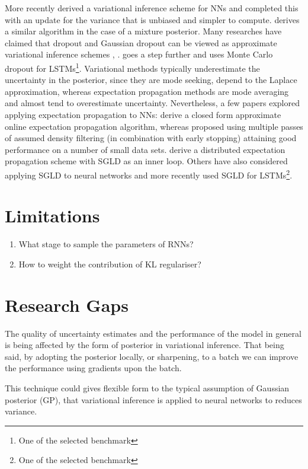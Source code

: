 More recently \cite{Graves2011} derived a variational inference scheme for NNs and
\cite{Blundell2015a} completed this with an update for the variance that is unbiased and simpler to compute.
\cite{Graves2016} derives a similar algorithm in the case of a mixture posterior.
Many researches have claimed that dropout \cite{Srivastava2014} and Gaussian dropout \cite{Wang2013} can be viewed as approximate variational inference schemes \cite{Gal2015}, \cite{Kingma2015}.
\cite{Gan2016} goes a step further and uses Monte Carlo dropout for LSTMs\footnote{One of the selected benchmark}.
Variational methods typically underestimate the uncertainty in the posterior, since they are mode seeking, depend to the Laplace approximation, whereas expectation propagation methods are mode averaging and almost tend to overestimate uncertainty.
Nevertheless, a few papers explored applying expectation propagation to NNs:
\cite{Soudry2014} derive a closed form approximate online expectation propagation algorithm, whereas \cite{Adams2015a} proposed using multiple passes of assumed density filtering (in combination with early stopping) attaining good performance on a number of small data sets.
\cite{Teh2015a} derive a distributed expectation propagation scheme with SGLD \cite{Welling2011} as an inner loop.
Others have also considered applying SGLD to neural networks \cite{Li2016a} and \cite{Gan2016} more recently used SGLD for LSTMs\footnote{One of the selected benchmark}.

\section{Limitations}
\begin{enumerate}
\item What stage to sample the parameters of RNNs?
\item How to weight the contribution of KL regulariser?
\end{enumerate}

\section{Research Gaps}
The quality of uncertainty estimates and the performance of the model in general is being affected by the form of posterior in variational inference.
That being said, by adopting the posterior locally, or sharpening, to a batch we can improve the performance using gradients upon the batch.

This technique could gives flexible form  to the typical assumption of Gaussian posterior (GP), that variational inference is applied to neural networks to reduces variance.

